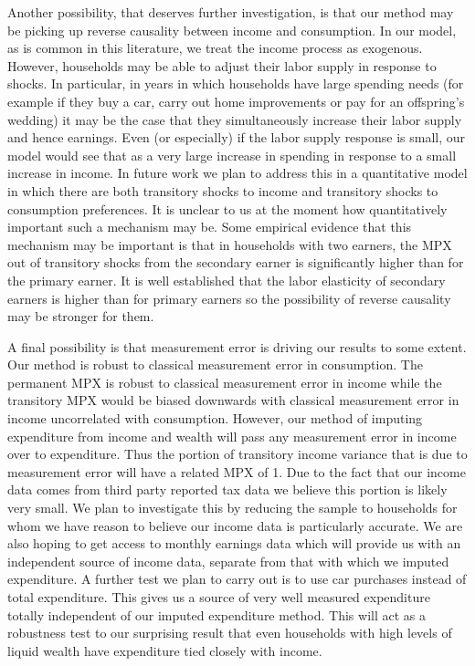 \documentclass[titlepage]{\econtex}\newcommand{\texname}{IncomeUncertainty}
\begin{document}
Another possibility, that deserves further investigation, is that our method may be picking up reverse causality between income and consumption. In our model, as is common in this literature, we treat the income process as exogenous. However, households may be able to adjust their labor supply in response to shocks. In particular, in years in which households have large spending needs (for example if they buy a car, carry out home improvements or pay for an offspring's wedding) it may be the case that they simultaneously increase their labor supply and hence earnings. Even (or especially) if the labor supply response is small, our model would see that as a very large increase in spending in response to a small increase in income. In future work we plan to address this in a quantitative model in which there are both transitory shocks to income and transitory shocks to consumption preferences. It is unclear to us at the moment how quantitatively important such a mechanism may be. Some empirical evidence that this mechanism may be important is that in households with two earners, the MPX out of transitory shocks from the secondary earner is significantly higher than for the primary earner. It is well established that the labor elasticity of secondary earners is higher than for primary earners so the possibility of reverse causality may be stronger for them.

A final possibility is that measurement error is driving our results to some extent. Our method is robust to classical measurement error in consumption. The permanent MPX is robust to classical measurement error in income while the transitory MPX would be biased downwards with classical measurement error in income uncorrelated with consumption. However, our method of imputing expenditure from income and wealth will pass any measurement error in income over to expenditure. Thus the portion of transitory income variance that is due to measurement error will have a related MPX of 1. Due to the fact that our income data comes from third party reported tax data we believe this portion is likely very small. We plan to investigate this by reducing the sample to households for whom we have reason to believe our income data is particularly accurate. We are also hoping to get access to monthly earnings data which will provide us with an independent source of income data, separate from that with which we imputed expenditure. A further test we plan to carry out is to use car purchases instead of total expenditure. This gives us a source of very well measured expenditure totally independent of our imputed expenditure method. This will act as a robustness test to our surprising result that even households with high levels of liquid wealth have expenditure tied closely with income.
\end{document}
